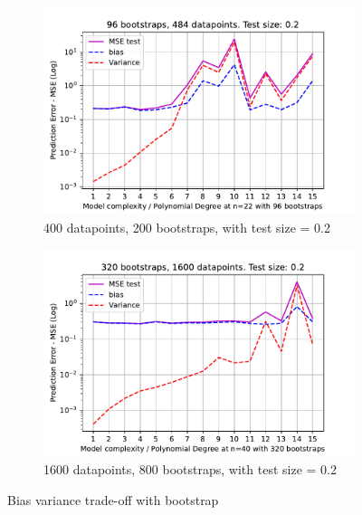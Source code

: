 \documentclass[11pt, a4paper]{article}
\begin{document}
\begin{figure}
  \centering
  \begin{subfigure}{0.49\textwidth}
      \centering
      \includegraphics[width=\textwidth]{figures/EX2_model_complexity_using_bootstrap_function_n_22_testsize_0.2.pdf}
      \caption{400 datapoints, 200 bootstraps, with test size = 0.2}
      \label{fig:bootstrap_bias_var_n_20}
  \end{subfigure}
  \hfill
  \begin{subfigure}{0.49\textwidth}
      \centering
      \includegraphics[width=\textwidth]{figures/EX2_model_complexity_using_bootstrap_function_n_40_testsize_0.2.pdf}
      \caption{1600 datapoints, 800 bootstraps, with test size = 0.2}
      \label{fig:bootstrap_bias_var_n_30}
  \end{subfigure}

     \caption{Bias variance trade-off with bootstrap}
     \label{fig:bootstrap_bias_var}
\end{figure}
\end{document}
